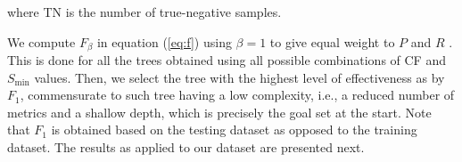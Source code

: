 % 
where TN is the number of true-negative samples. 

We compute $F_{\beta}$ in equation (\ref{eq:f}) using $\beta = 1$ to give equal weight to $P$ and $R$ \citep{McCarthy_1995_Proc}. This is done for all the trees obtained using all possible combinations of CF and $S_{\min}$ values. Then, we select the tree with the highest level of effectiveness as  by $F_1$, commensurate to such tree having a low complexity, i.e., a reduced number of metrics and a shallow depth, which is precisely the goal set at the start. Note that $F_1$ is obtained based on the testing dataset as opposed to the training dataset. The results as applied to our dataset are presented next.
